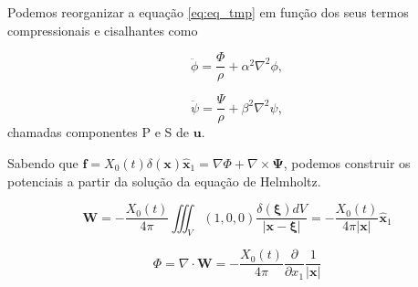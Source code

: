 \documentclass[a4paper,10pt]{article}
\begin{document}
Podemos reorganizar a equa\c{c}\~ao \ref{eq:eq_tmp} em fun\c{c}\~ao dos seus termos compressionais e cisalhantes
como

\begin{equation}
 \ddot{\phi} = \frac{\Phi}{\rho} + \alpha^2\nabla^2\phi,
\end{equation}

\begin{equation}
 \ddot{\psi} = \frac{\Psi}{\rho} + \beta^2\nabla^2\psi,
\end{equation}
chamadas componentes P e S de $\mathbf{u}$.

Sabendo que $\mathbf{f} = X_0(t)\delta(\mathbf{x})\widehat{\mathbf{x}}_1 = \nabla{\Phi} + \nabla\times\mathbf{\Psi}$, podemos construir os potenciais a partir da solução da equação de Helmholtz.

\begin{equation}
 \mathbf{W} = -\frac{X_0(t)}{4\pi}\iiint_V(1,0,0)\frac{\delta(\mathbf{\xi})dV}{|\mathbf{x}-\mathbf{\xi}|} = - \frac{X_0(t)}{4\pi|\mathbf{x}|}\widehat{{\mathbf{x}}}_1
\end{equation}

\begin{equation}
 \Phi = \nabla\cdot\mathbf{W} = -\frac{X_0(t)}{4\pi}\frac{\partial}{\partial{x}_1}\frac{1}{|\mathbf{x}|}
\end{equation}
\end{document}
